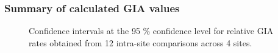 \subsubsection{Summary of calculated GIA values}

\begin{figure}[H]
	\caption{Confidence intervals at the 95 \% confidence level for relative GIA rates obtained from 12 intra-site comparisons across 4 sites.}
	\label{fig:intervalsGIA}
\end{figure}


\newpage

